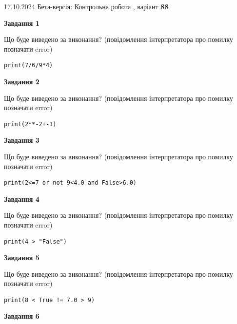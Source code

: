 \documentclass[12pt, ukrainian]{article}
\begin{document}
{\Large{17.10.2024 Бета-версія: Контрольна робота , варіант  \No \textbf { 88 }\par}}
{
\begin {large}
{\begin {center}\textbf{Завдання 1}\end {center}}

Що буде виведено за виконання? (повідомлення інтерпретатора про помилку позначати error)\par
\begin{verbatim}
print(7/6/9*4)
\end{verbatim}

{\begin {center}\textbf{Завдання 2}\end {center}}

Що буде виведено за виконання? (повідомлення інтерпретатора про помилку позначати error)\par
\begin{verbatim}
print(2**-2+-1)
\end{verbatim}

{\begin {center}\textbf{Завдання 3}\end {center}}

Що буде виведено за виконання? (повідомлення інтерпретатора про помилку позначати error)\par
\begin{verbatim}
print(2<=7 or not 9<4.0 and False>6.0)
\end{verbatim}

{\begin {center}\textbf{Завдання 4}\end {center}}

Що буде виведено за виконання? (повідомлення інтерпретатора про помилку позначати error)\par
\begin{verbatim}
print(4 > "False")
\end{verbatim}

{\begin {center}\textbf{Завдання 5}\end {center}}

Що буде виведено за виконання? (повідомлення інтерпретатора про помилку позначати error)\par
\begin{verbatim}
print(8 < True != 7.0 > 9)
\end{verbatim}

{\begin {center}\textbf{Завдання 6}\end {center}}


\end{large}}
\end{document}
